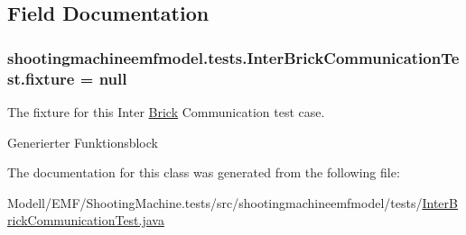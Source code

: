 \subsection{Field Documentation}
\hypertarget{classshootingmachineemfmodel_1_1tests_1_1_inter_brick_communication_test_a3c96face58bd8ec1152f83fe367b7644}{
\subsubsection[{fixture}]{ shootingmachineemfmodel.\-tests.\-Inter\-Brick\-Communication\-Test.\-fixture = null\hspace{0.3cm}{\ttfamily [protected]}}}\label{classshootingmachineemfmodel_1_1tests_1_1_inter_brick_communication_test_a3c96face58bd8ec1152f83fe367b7644}
The fixture for this Inter \hyperlink{interfaceshootingmachineemfmodel_1_1_brick}{Brick} Communication test case.

Generierter Funktionsblock 

The documentation for this class was generated from the following file\-:\begin{DoxyCompactItemize}
\item 
Modell/\-E\-M\-F/\-Shooting\-Machine.\-tests/src/shootingmachineemfmodel/tests/\hyperlink{_inter_brick_communication_test_8java}{Inter\-Brick\-Communication\-Test.\-java}\end{DoxyCompactItemize}

